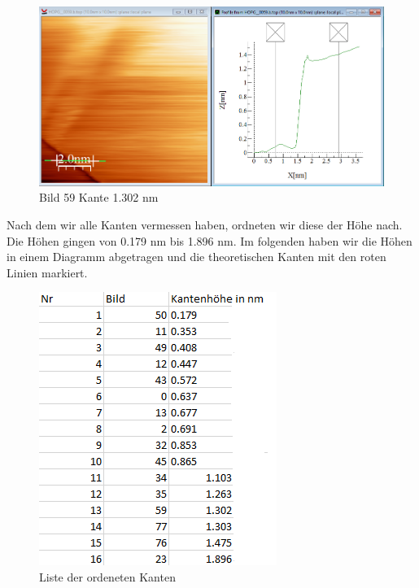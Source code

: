 \documentclass[10pt,a4paper]{article}
\begin{document}
\begin{figure}[]
	\includegraphics[scale = 0.2]{bild59.png}
	\centering
	\caption{Bild 59 Kante 1.302 nm}
	\label{b59}
\end{figure}

Nach dem wir alle Kanten vermessen haben, ordneten wir diese der Höhe nach. Die Höhen gingen von 0.179 nm bis 1.896 nm. Im folgenden haben wir die Höhen in einem Diagramm abgetragen und die theoretischen Kanten mit den roten Linien markiert.

\begin{figure}[]
	\includegraphics[scale = 0.5]{khglist.png}
	\centering
	\caption{Liste der ordeneten Kanten}
	\label{list}
\end{figure}
\end{document}
